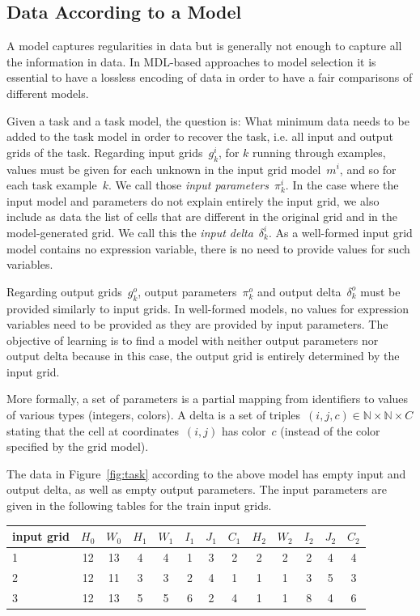 \documentclass[a4paper]{llncs}
\newcommand{\nat}{\mathbb{N}}
\begin{document}
\subsection{Data According to a Model}
\label{data}

A model captures regularities in data but is generally not enough to
capture all the information in data. In MDL-based approaches to model
selection it is essential to have a lossless encoding of data in order
to have a fair comparisons of different models.

Given a task and a task model, the question is: What minimum data
needs to be added to the task model in order to recover the task,
i.e. all input and output grids of the task.
%
Regarding input grids~$g^i_k$, for $k$ running through examples,
values must be given for each unknown in the input grid model~$m^i$,
and so for each task example~$k$. We call those {\em input
  parameters}~$\pi^i_k$. In the case where the input model and
parameters do not explain entirely the input grid, we also include as
data the list of cells that are different in the original grid and in
the model-generated grid. We call this the {\em input
  delta}~$\delta^i_k$. As a well-formed input grid model contains no
expression variable, there is no need to provide values for such
variables.

Regarding output grids~$g^o_k$, output parameters~$\pi^o_k$ and output
delta~$\delta^o_k$ must be provided similarly to input grids. In
well-formed models, no values for expression variables need to be
provided as they are provided by input parameters. The objective of
learning is to find a model with neither output parameters nor output
delta because in this case, the output grid is entirely determined by
the input grid.

More formally, a set of parameters is a partial mapping from
identifiers to values of various types (integers, colors). A delta is
a set of triples~$(i,j,c) \in \nat \times \nat \times C$ stating that
the cell at coordinates~$(i,j)$ has color~$c$ (instead of the color
specified by the grid model).

The data in Figure~\ref{fig:task} according to the above model has
empty input and output delta, as well as empty output parameters. The
input parameters are given in the following tables for the train input
grids.
\begin{center}
  \begin{tabular}{l|cccccccccccc}
    input grid & $H_0$ & $W_0$ & $H_1$ & $W_1$ & $I_1$ & $J_1$ & $C_1$ & $H_2$ & $W_2$ & $I_2$ & $J_2$ & $C_2$ \\
    \hline
    1 & 12 & 13 & 4 & 4 & 1 & 3 & 2 & 2 & 2 & 2 & 4 & 4 \\
    2 & 12 & 11 & 3 & 3 & 2 & 4 & 1 & 1 & 1 & 3 & 5 & 3 \\
    3 & 12 & 13 & 5 & 5 & 6 & 2 & 4 & 1 & 1 & 8 & 4 & 6 \\
    \hline
  \end{tabular}
\end{center}
\end{document}

